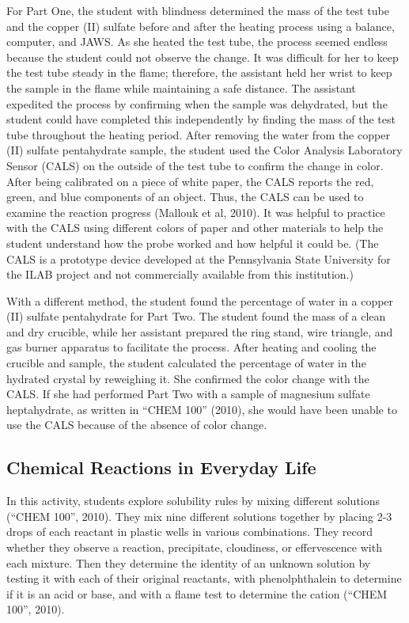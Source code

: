 \documentclass[11.5pt]{sig-alternate} %
\begin{document}
\begin{large}
For Part One, the student with blindness determined the mass of the test tube and the copper (II) sulfate before and after the heating process using a balance, computer, and JAWS. As she heated the test tube, the process seemed endless because the student could not observe the change. It was difficult for her to keep the test tube steady in the flame; therefore, the assistant held her wrist to keep the sample in the flame while maintaining a safe distance. The assistant expedited the process by confirming when the sample was dehydrated, but the student could have completed this independently by finding the mass of the test tube throughout the heating period. After removing the water from the copper (II) sulfate pentahydrate sample, the student used the Color Analysis Laboratory Sensor (CALS) on the outside of the test tube to confirm the change in color. After being calibrated on a piece of white paper, the CALS reports the red, green, and blue components of an object. Thus, the CALS can be used to examine the reaction progress (Mallouk et al, 2010). It was helpful to practice with the CALS using different colors of paper and other materials to help the student understand how the probe worked and how helpful it could be. (The CALS is a prototype device developed at the Pennsylvania State University for the ILAB project and not commercially available from this institution.)

With a different method, the student found the percentage of water in a copper (II) sulfate pentahydrate for Part Two. The student found the mass of a clean and dry crucible, while her assistant prepared the ring stand, wire triangle, and gas burner apparatus to facilitate the process. After heating and cooling the crucible and sample, the student calculated the percentage of water in the hydrated crystal by reweighing it. She confirmed the color change with the CALS. If she had performed Part Two with a sample of magnesium sulfate heptahydrate, as written in “CHEM 100” (2010), she would have been unable to use the CALS because of the absence of color change. 

\subsection*{Chemical Reactions in Everyday Life}

In this activity, students explore solubility rules by mixing different solutions (“CHEM 100”, 2010). They mix nine different solutions together by placing 2-3 drops of each reactant in plastic wells in various combinations. They record whether they observe a reaction, precipitate, cloudiness, or effervescence with each mixture. Then they determine the identity of an unknown solution by testing it with each of their original reactants, with phenolphthalein to determine if it is an acid or base, and with a flame test to determine the cation (“CHEM 100”, 2010). 


\end{large}
\end{document}
